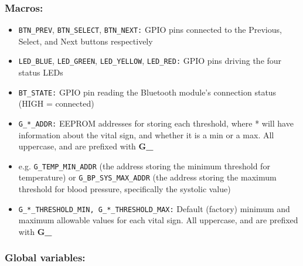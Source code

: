 \subsubsection{Macros:}
\begin{itemize}
	\item \lstinline|BTN_PREV|, \lstinline|BTN_SELECT|, \lstinline|BTN_NEXT:| GPIO pins connected to the Previous, Select, and Next buttons respectively
	\item \lstinline|LED_BLUE|, \lstinline|LED_GREEN|, \lstinline|LED_YELLOW|, \lstinline|LED_RED:| GPIO pins driving the four status LEDs
	\item \lstinline|BT_STATE:| GPIO pin reading the Bluetooth module's connection status (HIGH = connected)
	\item \lstinline|G_*_ADDR:| EEPROM addresses for storing each threshold, where * will have information about the vital sign, and whether it is a min or a max. All uppercase, and are prefixed with \textbf{G\_}
	\item[] \par\hspace*{2em} e.g. \lstinline|G_TEMP_MIN_ADDR| (the address storing the minimum threshold for temperature) or \lstinline|G_BP_SYS_MAX_ADDR| (the address storing the maximum threshold for blood pressure, specifically the systolic value)
	\item \lstinline|G_*_THRESHOLD_MIN, G_*_THRESHOLD_MAX:| Default (factory) minimum and maximum allowable values for each vital sign. All uppercase, and are prefixed with \textbf{G\_}
\end{itemize}

\subsubsection{Global variables:}
